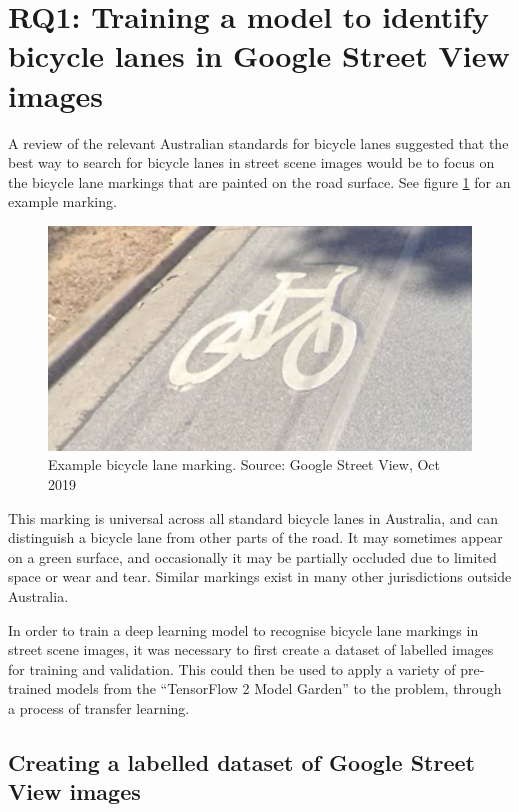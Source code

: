 \documentclass[11pt,twoside]{report}
\begin{document}
\section{RQ1: Training a model to identify bicycle lanes in Google Street View images}
\label{s:rq1}

A review of the relevant Australian standards for bicycle lanes \cite{standards} suggested that the best way to search for bicycle lanes in street scene images would be to focus on the bicycle lane markings that are painted on the road surface.  See figure \ref{fig:symbol} for an example marking.  

\begin{figure}[h]
\centering
\includegraphics[scale=0.60]{f001_symbol.png}
\caption{Example bicycle lane marking.  Source: Google Street View, Oct 2019}
\label{fig:symbol}
\end{figure}

This marking is universal across all standard bicycle lanes in Australia, and can distinguish a bicycle lane from other parts of the road.  It may sometimes appear on a green surface, and occasionally it may be partially occluded due to limited space or wear and tear.  Similar markings exist in many other jurisdictions outside Australia.

In order to train a deep learning model to recognise bicycle lane markings in street scene images, it was necessary to first create a dataset of labelled images for training and validation.  This could then be used to apply a variety of pre-trained models from the ``TensorFlow 2 Model Garden'' to the problem, through a process of transfer learning.

\subsection{Creating a labelled dataset of Google Street View images}
\end{document}
